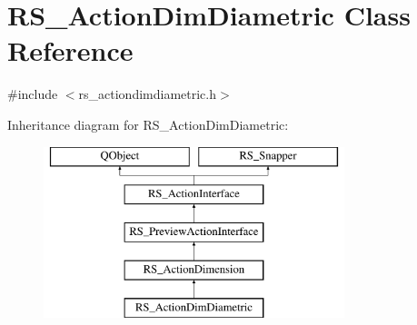 \hypertarget{classRS__ActionDimDiametric}{\section{R\-S\-\_\-\-Action\-Dim\-Diametric Class Reference}
\label{classRS__ActionDimDiametric}
}


{\ttfamily \#include $<$rs\-\_\-actiondimdiametric.\-h$>$}

Inheritance diagram for R\-S\-\_\-\-Action\-Dim\-Diametric\-:\begin{figure}[H]
\begin{center}
\leavevmode
\includegraphics[height=5.000000cm]{classRS__ActionDimDiametric}
\end{center}
\end{figure}
